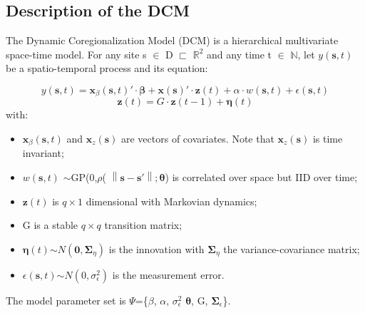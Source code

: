 \subsection{Description of the DCM}
The Dynamic Coregionalization Model (DCM) is a hierarchical multivariate space-time model.
For any site s $\in$ D $\sqsubset$ $\mathbb{R}^2$ and any time t  $\in$ $\mathbb{N}$, let $y(\pmb{s},t)$ be a spatio-temporal process and its equation:

\begin{displaymath}{
		y(\pmb{s},t) = \pmb{x}_{\beta}(\pmb{s},t)' \cdot \pmb{\beta} + \pmb{x}(\pmb{s})' \cdot \pmb{z}(t)+ \alpha \cdot w(\pmb{s},t) + \epsilon(\pmb{s},t)}
\end{displaymath}
\begin{displaymath}{
		\pmb{z}(t) = G \cdot \pmb{z}(t-1) + \pmb{\eta}(t)}
\end{displaymath}
with:
\begin{itemize}
	\item \begin{math}
		\pmb{x}_{\beta}(\pmb{s},t)
	\end{math} and \begin{math}{
		 \pmb{x}_z(\pmb{s})}
	 \end{math} are vectors of covariates. Note that \begin{math}{ 
	 	\pmb{x}_z(\pmb{s})}
 	\end{math} is time invariant;
	\item \begin{math}{
			w(\pmb{s},t)}
		\end{math}
	$\sim$GP(0,$\rho$(
	\begin{math}{ \left \| \pmb{s}-\pmb{s}' \right \|;\pmb{\theta}}
	\end{math}) is correlated over space but IID over time;
	\item \begin{math}{\pmb{z}(t)}\end{math} is $q \times 1$ dimensional with Markovian dynamics;
	\item G is a stable $q \times q$ transition matrix;
	\item \begin{math}{\pmb{\eta}(t)}\end{math}$\sim$\begin{math}{\mathit{N}(\pmb{0},\pmb{\Sigma}_\eta)}\end{math} is the innovation with \begin{math}{\pmb{\Sigma}_\eta}\end{math} the variance-covariance matrix;
	\item \begin{math}{\epsilon(\pmb{s},t)}\end{math}$\sim$\begin{math}{
			\mathit{N}(0,\sigma_\epsilon^2)}	\end{math} is the measurement error.
\end{itemize}
 The model parameter set is $\Psi$=\{\textbf{$\beta$}, $\alpha$, $\sigma_\epsilon^2$ $\pmb{\theta}$, G, $\pmb{\Sigma}_\epsilon$\}.